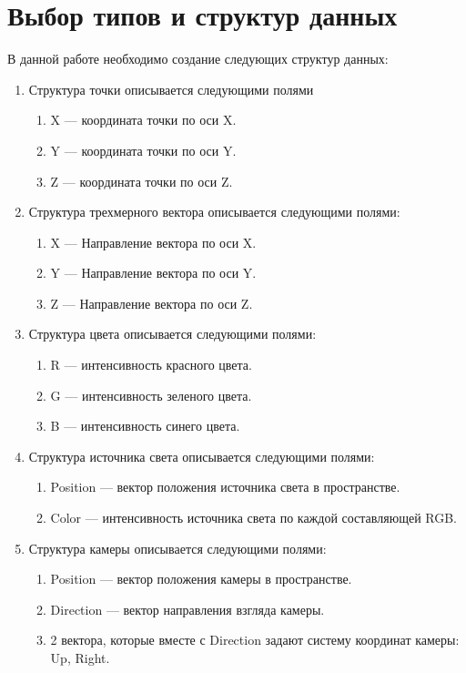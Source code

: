 \section{Выбор типов и структур данных}
В данной работе необходимо создание следующих структур данных:
\begin{enumerate}
	\item Структура точки описывается следующими полями
	\begin{enumerate}
		\item X --- координата точки по оси X.
		\item Y --- координата точки по оси Y.
		\item Z --- координата точки по оси Z.
	\end{enumerate}

	\item Структура трехмерного вектора описывается следующими полями:
	\begin{enumerate}
		\item X --- Направление вектора по  оси X.
		\item Y --- Направление вектора  по оси Y.
		\item Z --- Направление вектора  по оси Z.
	\end{enumerate}

	\item Структура цвета описывается следующими полями:
	\begin{enumerate}
		\item R --- интенсивность красного цвета.
		\item G --- интенсивность зеленого цвета.
		\item B --- интенсивность синего цвета.
	\end{enumerate}

	\item Структура источника света описывается следующими полями:
	\begin{enumerate}
		\item Position --- вектор положения источника света в пространстве.
		\item Color --- интенсивность источника света по каждой составляющей RGB.
	\end{enumerate}

	\item Структура камеры описывается следующими полями:
	\begin{enumerate}
		\item Position --- вектор положения камеры в пространстве.
		\item Direction --- вектор направления взгляда камеры.
		\item 2 вектора, которые вместе с Direction задают систему координат камеры: Up, Right.
	\end{enumerate}
	

\end{enumerate}
